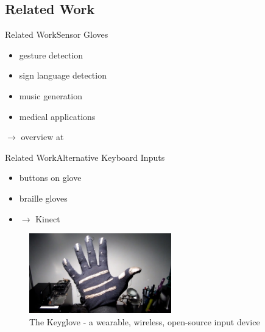 \subsection{Related Work}
\begin{frame}{Related Work}{Sensor Gloves}
    \begin{itemize}
        \item gesture detection \citep{web:cyberglove} \citep{zimmerman-flex-gloves} \citep{imu-emg}
        \item sign language detection \citep{imu-emg} \cite{mehdi-sign-language-glove}
        \item music generation \citep{web:mimugloves}
        \item medical applications \citep{cavallo-senshand-parkinsons}
    \end{itemize}

    $\rightarrow$ overview at  \citep{web:mimugloves-overview}

\end{frame}

\begin{frame}{Related Work}{Alternative Keyboard Inputs}
    \begin{itemize}
        \item buttons on glove \citep{web:keyglove}
        \item braille gloves \citep{braille-gloves}
        \item {} \citep{ellithorpe-kinect-typing} $\rightarrow$ Kinect
    \end{itemize}

    \centering
    \begin{figure}
        \includegraphics[width=0.55\textwidth]{../common/images/keyglove}
        \caption{The Keyglove - a wearable, wireless, open-source input device}
    \end{figure}
\end{frame}

